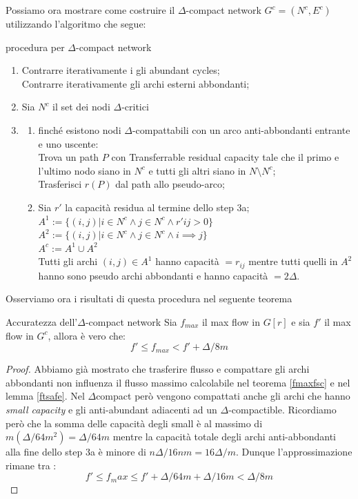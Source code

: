 \documentclass[a4paper, 11pt]{report}
\newcommand{\dlt}{$\Delta$}
\begin{document}
\noindent Possiamo ora mostrare come costruire il $\Delta$-compact network $G^c = (N^c, E^c)$ utilizzando l'algoritmo che segue:

\begin{algo}{procedura per $\Delta$-compact network}{}
    \begin{enumerate}
        \item Contrarre iterativamente i gli abundant cycles; \\Contrarre iterativamente gli archi esterni abbondanti;
        \item Sia $N^c$ il set dei nodi $\Delta$-critici 
        \item \begin{enumerate}
            \item finché esistono nodi \dlt-compattabili con un arco anti-abbondanti entrante e uno uscente:\\
            Trova un path $P$ con Transferrable residual capacity tale che il primo e l'ultimo nodo siano in $N^c$ e tutti gli altri siano in $N \setminus N^c$;\\
            Trasferisci $r(P)$ dal path allo pseudo-arco;
            \item Sia $r'$ la capacità residua al termine dello step 3a;\\
                $A^1 := \{(i,j)| i\in N^c\land j\in N^c\land r'{ij}> 0\}$\\
                $A^2 := \{(i,j)| i\in N^c\land j\in N^c\land i \implies j\}$\\
                $A^c := A^1\cup A^2$\\
                Tutti gli archi $(i,j)\in A^1$ hanno capacità $= r_{ij}$ mentre tutti quelli in $A^2$ hanno sono pseudo archi abbondanti e hanno capacità $= 2\Delta$.
                
        \end{enumerate}
    \end{enumerate}
\end{algo}



Osserviamo ora i risultati di questa procedura nel seguente teorema
\begin{theo}{Accuratezza dell'\dlt-compact network}{}
    Sia $f_{max}$ il max flow in $G[r]$ e sia $f'$ il max flow in $G^c$, allora è vero che:
    \[f'\le f_{max} < f'+\Delta/8m\]
\end{theo}
\begin{proof}
    Abbiamo già mostrato che trasferire flusso e compattare gli archi abbondanti non influenza il flusso massimo calcolabile nel teorema \ref{fmaxfsc} e nel lemma \ref{ftsafe}.
    Nel \dlt compact però vengono compattati anche gli archi che hanno \textit{small capacity} e gli anti-abundant adiacenti ad un \dlt-compactible.
    Ricordiamo però che la somma delle capacità degli small è al massimo di $m(\Delta/64m^2) = \Delta/64m$ mentre la capacità totale degli archi anti-abbondanti alla fine dello step 3a è minore di $n\Delta/16nm = 16\Delta/m$.
    Dunque l'approssimazione rimane tra :
    \[f'\le f_max\le f' + \Delta/64m + \Delta/16m < \Delta/8m\]
\end{proof}
\end{document}
